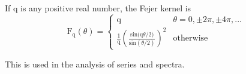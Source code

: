 If q is any positive real number, the Fejer kernel is
\[ \mathrm{F}_{\mathrm{q}} ( \theta ) = \left \{
\begin{array}{cc}
  \mathrm{q} & \theta = 0, \pm 2 \pi , \pm 4 \pi, ... \\
  \frac{1}{\mathrm{q}} \left( \frac{\mathrm{sin(q} \theta / 2)}
       {\mathrm{sin} ( \theta / 2 ) }  \right )^2 & \mathrm{otherwise} 
\end{array}
\right . \]
\par
This is used in the analysis of series and spectra.